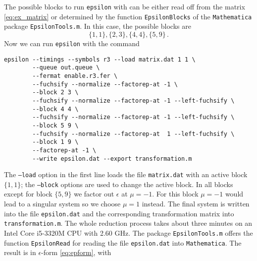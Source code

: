\documentclass[12pt]{article}
\numberwithin{equation}{section}
\numberwithin{figure}{section}
\begin{document}
    The possible blocks to run \texttt{epsilon} with can be either read off from the matrix \eqref{eq:ex_matrix} or determined by the function \texttt{EpsilonBlocks} of the \texttt{Mathematica} package \texttt{EpsilonTools.m}.
    In this case, the possible blocks are
    \[
      \{1,1\},
      \{2,3\},
      \{4,4\},
      \{5,9\}\,.
    \]
    Now we can run \texttt{epsilon} with the command
    \begin{lstlisting}[basicstyle=\ttfamily,xleftmargin=-2em]
      epsilon --timings --symbols r3 --load matrix.dat 1 1 \
        --queue out.queue \
        --fermat enable.r3.fer \
        --fuchsify --normalize --factorep-at -1 \
        --block 2 3 \
        --fuchsify --normalize --factorep-at -1 --left-fuchsify \
        --block 4 4 \
        --fuchsify --normalize --factorep-at -1 --left-fuchsify \
        --block 5 9 \
        --fuchsify --normalize --factorep-at  1 --left-fuchsify \
        --block 1 9 \
        --factorep-at -1 \
        --write epsilon.dat --export transformation.m
    \end{lstlisting}
    The \texttt{--load} option in the first line loads the file \texttt{matrix.dat} with an active block $\{1,1\}$; the \texttt{--block} options are used to change the active block.
    In all blocks except for block $\{5,9\}$ we factor out $\epsilon$ at $\mu=-1$.
    For this block $\mu=-1$ would lead to a singular system so we choose $\mu=1$ instead.
    The final system is written into the file \texttt{epsilon.dat} and the corresponding transformation matrix into \texttt{transformation.m}.
    The whole reduction process takes about three minutes on an Intel Core i5-3320M CPU with 2.60 GHz.
    The package \texttt{EpsilonTools.m} offers the function \texttt{EpsilonRead} for reading the file \texttt{epsilon.dat} into \texttt{Mathematica}.
    The result is in $\epsilon$-form \eqref{eq:epform}, with
\end{document}
